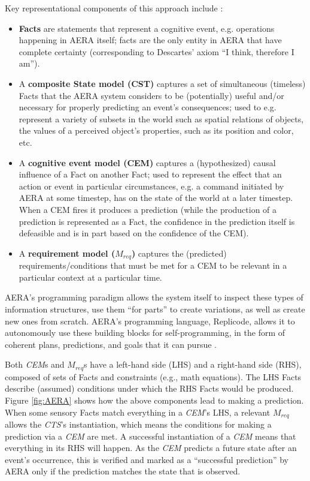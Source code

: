 \documentclass[runningheads]{llncs}
\begin{document}
Key representational components of this approach include \cite{sheikhlar2024autonomous,sheikhlar2024causal}: 
\begin{itemize}
	\item \textbf{Facts} are statements that represent a cognitive event, e.g. operations happening in AERA itself; facts are the only entity in AERA that have complete certainty (corresponding to Descartes' axiom “I think, therefore I am”).
	\item A \textbf{composite State model (CST)} captures a set of simultaneous (timeless) Facts that the AERA system considers to be (potentially) useful and/or necessary for properly predicting an event’s consequences; used to e.g. represent a variety of subsets in the world such as spatial relations of objects, the values of a perceived object’s properties, such as its position and color, etc. %
	\item A \textbf{cognitive event model (CEM)} captures a (hypothesized) causal influence of a Fact on another Fact; used to represent the effect that an action or event in particular circumstances, e.g. a command initiated by AERA at some timestep, has on the state of the world at a later timestep. When a CEM fires it produces a prediction (while the production of a prediction is represented as a Fact, the confidence in the prediction itself is defeasible and is in part based on the confidence of the CEM).
	\item A \textbf{requirement model ($M_{req}$)} captures the (predicted) requirements/conditions that must be met for a CEM to be relevant in a particular context at a particular time.
%	
\end{itemize}

AERA’s programming paradigm allows the system itself to inspect these types of information structures, use them “for parts” to create variations, as well as create new ones from scratch. AERA’s programming language, Replicode, allows it to autonomously use these building blocks for self-programming, in the form of coherent plans, predictions, and goals that it can pursue \cite{nivel2013towards,nivel2013replicode,thorisson2012new}. 

Both \textit{CEM}s and $M_{req}$s have a left-hand side (LHS) and a right-hand side (RHS), composed of sets of Facts and constraints (e.g., math equations). The LHS Facts describe (assumed) conditions under which the RHS Facts would be produced. Figure \ref{fig:AERA} shows how the above components lead to making a prediction. When some sensory Facts match everything in a \textit{CEM}’s LHS, a relevant $M_{req}$ allows the \textit{CTS}’s instantiation, which means the conditions for making a prediction via a \textit{CEM} are met. A successful instantiation of a \textit{CEM} means that everything in its RHS will happen. 
As the \textit{CEM} predicts a future state after an event’s occurrence, this is verified and marked as a “successful prediction” by AERA only if the prediction matches the state that is observed.
\end{document}

